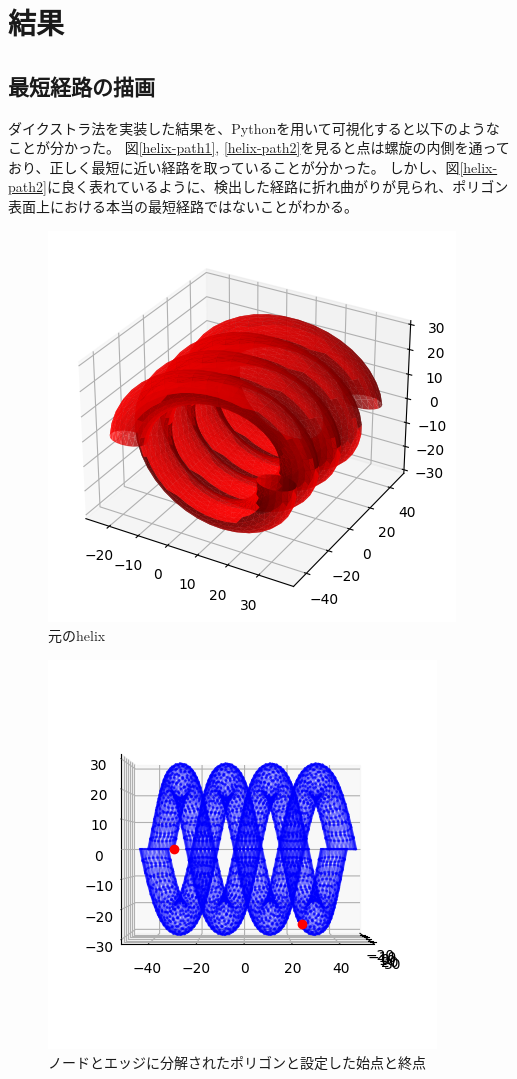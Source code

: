 \documentclass[a4paper,11pt]{jsarticle}
\begin{document}
\section{結果}

\subsection{最短経路の描画}

ダイクストラ法を実装した結果を、Pythonを用いて可視化すると以下のようなことが分かった。
図\ref{helix-path1}, \ref{helix-path2}を見ると点は螺旋の内側を通っており、正しく最短に近い経路を取っていることが分かった。
しかし、図\ref{helix-path2}に良く表れているように、検出した経路に折れ曲がりが見られ、ポリゴン表面上における本当の最短経路ではないことがわかる。

\begin{figure}[H]
  \centering
  \includegraphics[scale = 1.0]{../Figs/red-helix.png}
  \caption{元のhelix}
  \label{red-helix}
\end{figure}

\begin{figure}[H]
  \centering
  \includegraphics[scale = 1.0]{../Figs/helix-0to634-endpoints.png}
  \caption{ノードとエッジに分解されたポリゴンと設定した始点と終点}
  \label{helix-endpoints}
\end{figure}
\end{document}
